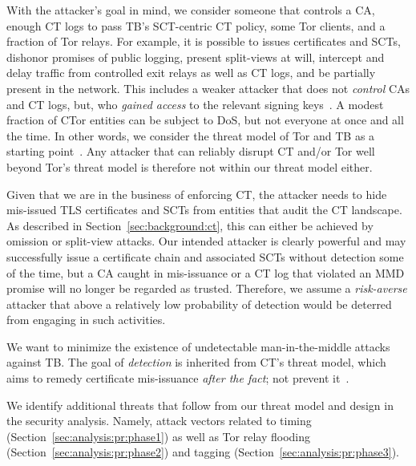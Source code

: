 With
the attacker's goal in mind, we consider someone that controls
	a CA,
	enough CT logs to pass TB's SCT-centric CT policy, 
	some Tor clients, and
	a fraction of Tor relays.
For example, it is possible to
	issues certificates and SCTs,
	dishonor promises of public logging,
	present split-views at will,
	intercept and delay traffic from controlled exit relays as well as CT logs,
		and
	be partially present in the network.
This includes a weaker attacker that does not \emph{control} CAs and CT logs,
but, who \emph{gained access} to the relevant signing keys~\cite{turktrust,%
gdca1-omission}.  A modest fraction of CTor entities can be subject to DoS, but
not everyone at once and all the time.  In other words, we consider the threat
model of Tor and TB as a starting point~\cite{tor,tor-browser}.  Any
attacker that can reliably disrupt CT and/or Tor well beyond Tor's threat
model is therefore not within our threat model either.

%
%
Given that we are in the business of enforcing CT, the attacker needs to hide
mis-issued TLS certificates and SCTs from entities that audit the CT landscape.
As described in Section~\ref{sec:background:ct}, this can either be achieved by
omission or split-view attacks.  Our intended attacker is clearly powerful and may
successfully issue a certificate chain and associated SCTs without detection
some of the time, but a CA caught in mis-issuance or a CT log that violated an
MMD promise will no longer be regarded as trusted.  Therefore, we assume a
\emph{risk-averse} attacker that above a relatively low probability of detection
would be deterred from engaging in such activities.

%
%
We want to minimize the existence of undetectable man-in-the-middle attacks
against TB.  The goal of \emph{detection} is inherited from CT's threat
model, which aims to remedy certificate mis-issuance \emph{after the fact}; not
prevent it~\cite{ct/a}.

%
%
We identify additional threats that follow from our threat model and design
in the security analysis.  Namely, attack vectors related to
	timing (Section~\ref{sec:analysis:pr:phase1}) as well as
	Tor relay flooding (Section~\ref{sec:analysis:pr:phase2}) and
        tagging (Section~\ref{sec:analysis:pr:phase3}).
        
